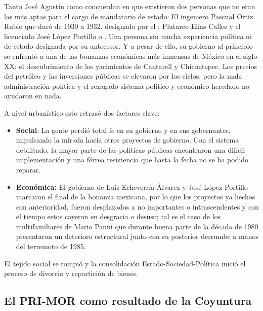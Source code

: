 Tanto José Agustín como \cite{molina2018} concuerdan en que existieron dos personas que no eran las más aptas para el cargo de mandatario de estado: 
El ingeniero Pascual Ortiz Rubio que duró de 1930 a 1932, designado por el ; Plutarco Elías Calles y el licenciado José López Portillo o 
 \cite{agustin_tragicomedia1}. Una persona sin mucha experiencia política ni de estado designada por su antecesor. Y a pesar de ello, 
su gobierno al principio se enfrentó a una de las bonanzas económicas más inmensas de México en el siglo XX: el descubrimiento de los yacimientos de Cantarell y
Chicontepec. Los precios del petróleo y las inversiones públicas se elevaron por los cielos, pero la mala administración política y el rezagado sistema político y
económico heredado no ayudaron en nada.

A nivel urbanístico esto retrasó dos factores clave:
\begin{itemize}
      \item \textbf{Social}: La gente perdió total fe en su gobierno y en sus gobernantes, impulsando la mirada hacia otros proyectos de gobierno. Con el sistema debilitado,
            la mayor parte de las políticas públicas encontraron una difícil implementación y una férrea resistencia que hasta la fecha no se ha podido reparar.
      \item \textbf{Económica:} El gobierno de Luis Echeverría Álvarez y José López Portillo marcaron el final de la bonanza mexicana, por lo que los proyectos ya hechos 
            con anterioridad, fueron desplazados a no importantes o intrascendentes y con el tiempo estos cayeron en desgracia o desuso; tal es el caso de los 
            multifamiliares de Mario Panni que durante buena parte de la década de 1980 presentaron un deterioro estructural junto con su posterior derrumbe a manos 
            del terremoto de 1985.
\end{itemize}
El tejido social se rompió y la consolidación Estado-Sociedad-Política inició el proceso de divorcio y repartición de bienes.

\subsection{El PRI-MOR como resultado de la Coyuntura}
\label{ssec:PRI-MOR-Coyuntura}

